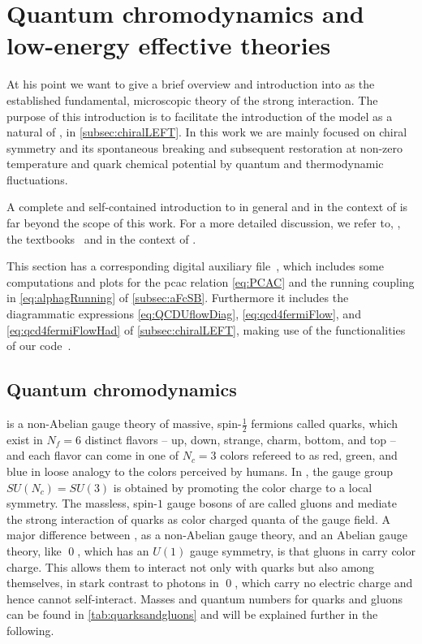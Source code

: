 \section{Quantum chromodynamics and low-energy effective theories}\label{sec:qcdModels}
At his point we want to give a brief overview and introduction into  as the established fundamental, microscopic theory of the strong interaction.
The purpose of this introduction is to facilitate the introduction of the  model as a natural \loeft{} of \qcd{}, in \cref{subsec:chiralLEFT}.
In this work we are mainly focused on chiral symmetry and its spontaneous breaking and subsequent restoration at non-zero temperature and quark chemical potential by quantum and thermodynamic fluctuations.

A complete and self-contained introduction to \qcd{} in general and in the context of \frg{} is far beyond the scope of this work. 
For a more detailed discussion, we refer to, \eg{}, the textbooks~\cite{Ryder1996Jun,Peskin:1995ev,Burgess2006Dec,Greiner2007,Schwartz2013Dec} and  in the context of \frg{}.

This section has a corresponding digital auxiliary file~\cite{Steil:2023PhDqcd}, which includes some computations and plots for the \acrshort{pcac} relation \eqref{eq:PCAC} and the running coupling in \cref{eq:alphagRunning} of \cref{subsec:aFcSB}.
Furthermore it includes the diagrammatic expressions \eqref{eq:QCDUflowDiag}, \eqref{eq:qcd4fermiFlow}, and \eqref{eq:qcd4fermiFlowHad} of \cref{subsec:chiralLEFT}, making use of the functionalities of our \WAM{} code~\cite{Steil:2023PhDFlowEquationsNB}.

\subsection{Quantum chromodynamics}\label{subsec:qcd}
\qcd{} is a non-Abelian gauge theory of massive, spin-$\frac{1}{2}$ fermions called quarks, which exist in $N_f=6$ distinct flavors – up, down, strange, charm, bottom, and top – and each flavor can come in one of $N_c=3$ colors \dash{} refereed to as red, green, and blue in loose analogy to the colors perceived by humans.
In \qcd{}, the gauge group $SU(N_c)=SU(3)$ is obtained by promoting the color charge to a local symmetry. 
The massless, spin-$1$ gauge bosons of \qcd{} are called gluons and mediate the strong interaction of quarks as color charged quanta of the gauge field.
A major difference between \qcd{}, as a non-Abelian  gauge theory, and an Abelian gauge theory, like \qed{}, which has an $U(1)$ gauge symmetry, is that gluons in \qcd{} carry color charge.
This allows them to interact not only with quarks but also among themselves, in stark contrast to photons in \qed{}, which carry no electric charge and hence cannot self-interact.
Masses and quantum numbers for quarks and gluons can be found in \cref{tab:quarksandgluons} and will be explained further in the following.

